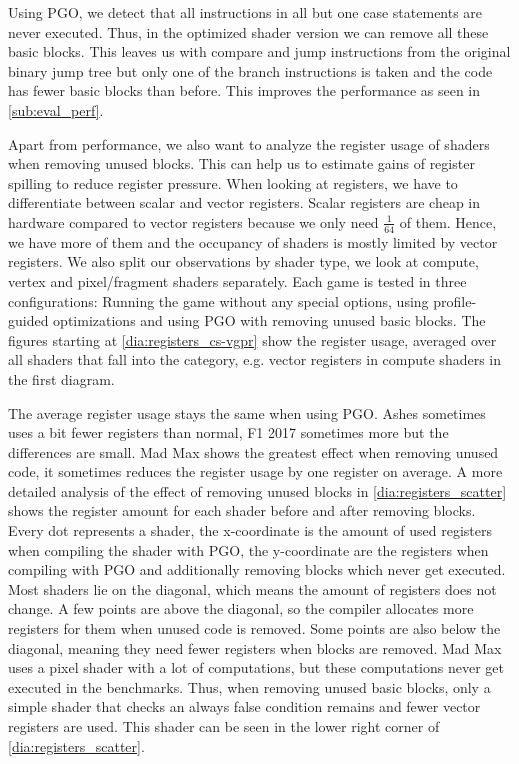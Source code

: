 Using PGO, we detect that all instructions in all but one case statements are never executed.
Thus, in the optimized shader version we can remove all these basic blocks.
This leaves us with compare and jump instructions from the original binary jump tree but only one of the branch instructions is taken and the code has fewer basic blocks than before.
This improves the performance as seen in \cref{sub:eval_perf}.

Apart from performance, we also want to analyze the register usage of shaders when removing unused blocks.
This can help us to estimate gains of register spilling to reduce register pressure.
When looking at registers, we have to differentiate between scalar and vector registers.
Scalar registers are cheap in hardware compared to vector registers because we only need $\frac{1}{64}$ of them.
Hence, we have more of them and the occupancy of shaders is mostly limited by vector registers.
We also split our observations by shader type, we look at compute, vertex and pixel/fragment shaders separately.
Each game is tested in three configurations: Running the game without any special options, using profile-guided optimizations and using PGO with removing unused basic blocks.
The figures starting at \cref{dia:registers_cs-vgpr} show the register usage, averaged over all shaders that fall into the category, e.g. vector registers in compute shaders in the first diagram.


The average register usage stays the same when using PGO. Ashes sometimes uses a bit fewer registers than normal, F1 2017 sometimes more but the differences are small.
Mad Max shows the greatest effect when removing unused code, it sometimes reduces the register usage by one register on average.
A more detailed analysis of the effect of removing unused blocks in \cref{dia:registers_scatter} shows the register amount for each shader before and after removing blocks.
Every dot represents a shader, the x-coordinate is the amount of used registers when compiling the shader with PGO, the y-coordinate are the registers when compiling with PGO and additionally removing blocks which never get executed.
Most shaders lie on the diagonal, which means the amount of registers does not change.
A few points are above the diagonal, so the compiler allocates more registers for them when unused code is removed.
Some points are also below the diagonal, meaning they need fewer registers when blocks are removed.
Mad Max uses a pixel shader with a lot of computations, but these computations never get executed in the benchmarks.
Thus, when removing unused basic blocks, only a simple shader that checks an always false condition remains and fewer vector registers are used.
This shader can be seen in the lower right corner of \cref{dia:registers_scatter}.


